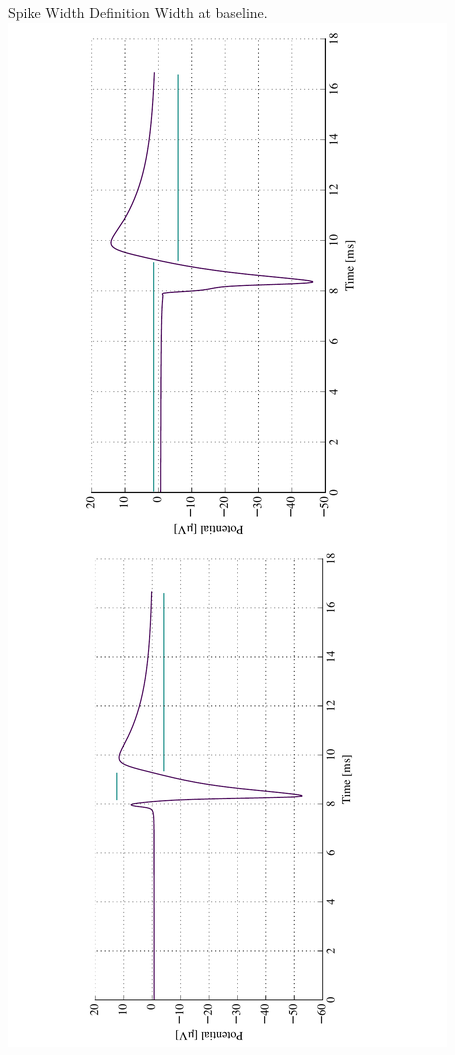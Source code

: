 \documentclass{beamer}
\begin{document}
\begin{frame}{Spike Width Definition}
    Width at baseline.
    \centering
    \includegraphics[angle=-90,width=\textwidth]{images/width_bad.pdf}
\end{frame}
\end{document}
